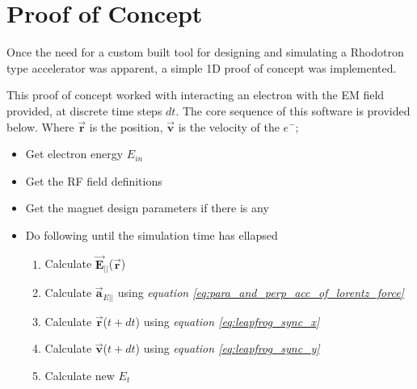 \documentclass{article}
\begin{document}
\newcommand{\vecthreeBF}[1]{\vec{\textbf{#1}}}
\newcommand{\vecthree}[1]{\vec{#1}}

\newcommand{\parDeriv}[2]{\frac{\partial #1}{\partial #2}}
\newcommand{\parDerivS}[2]{\frac{\partial^2 #1}{\partial #2^2}}
\newcommand{\derivS}[2]{\frac{d^2 #1}{d#2^2}}

\newcommand{\dotProdBF}[2]{\vecthreeBF{#1} \cdot \vecthreeBF{#2}}
\newcommand{\dotProd}[2]{\vecthree{#1} \cdot \vecthree{#2}}

\newcommand{\crossProdBF}[2]{\vecthreeBF{#1} \times \vecthreeBF{#2}}
\newcommand{\crossProd}[2]{\vecthree{#1} \times \vecthree{#2}}


\newcommand{\fromeq}[1]{\textit{equation \ref{eq:#1}}}
\newcommand{\fromeqs}[2]{\textit{equations \ref{eq:#1} and \ref{eq:#2}}}
\newcommand{\fromeqsth}[3]{\textit{equations \ref{eq:#1}, \ref{eq:#2} and \ref{eq:#3}}}

\newcommand{\fromfig}[1]{\textit{figure \ref{fig:#1}}}
\newcommand{\fromfigs}[2]{\textit{figures \ref{fig:#1} and \ref{fig:#2}}}

\newcommand{\fromsec}[1]{\textit{section \ref{sec:#1}}}
\newcommand{\fromsecs}[2]{\textit{sections \ref{sec:#1} and \ref{sec:#2}}}



\section{Proof of Concept}
Once the need for a custom built tool for designing and simulating a Rhodotron type accelerator was apparent, a simple 1D proof of concept was implemented.

This proof of concept worked with interacting an electron with the EM field provided, at discrete time steps $dt$. The core sequence of this software is provided below.
Where $\vecthreeBF{r}$ is the position, $\vecthreeBF{v}$ is the velocity of the $e^-$;
\begin{itemize}
    \item Get electron energy $E_{in}$
    \item Get the RF field definitions
    \item Get the magnet design parameters if there is any
    \item Do following until the simulation time has ellapsed
    \begin{enumerate}
        \item Calculate $\vecthreeBF{E}_{||}$($\vecthreeBF{r}$)
        \item Calculate $\vecthreeBF{a}_{E ||}$ using \fromeq{para_and_perp_acc_of_lorentz_force}
        \item Calculate $\vecthreeBF{r}$($t+dt$) using \fromeq{leapfrog_sync_x}
        \item Calculate $\vecthreeBF{v}$($t+dt$) using \fromeq{leapfrog_sync_y}
        \item Calculate new $E_t$
    \end{enumerate}
\end{itemize}
\end{document}
